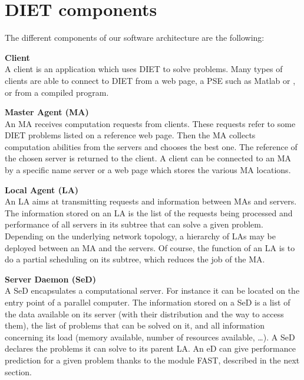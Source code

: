 \section{DIET components}
\label{sec:components}

The different components of our software architecture are the following:      

\begin{description}
\item \textbf{Client}\\
  A client is an application which uses DIET to solve problems.  Many types of clients are able to connect to DIET from a web page, a PSE such as
  Matlab or \sci, or from a compiled program.
\item \textbf{Master Agent (MA)}\\
  An MA receives computation requests from clients. These requests refer to some
  DIET problems listed on a reference web page. Then the MA collects computation
  abilities from the servers and chooses the best one. The reference of the
  chosen server is returned to the client. A client can be connected to an MA by
  a specific name server or a web page which stores the various MA locations.

\item \textbf{Local Agent (LA)}\\
  An LA aims at transmitting requests and information between MAs and
  servers.  The information stored on an LA is the list of the
  requests being processed and performance of all servers in its
  subtree that can solve a given problem. Depending on the underlying
  network topology, a hierarchy of LAs may be deployed between an MA
  and the servers. Of course, the function of an LA is to do a partial
  scheduling on its subtree, which reduces the job of the MA.

\item \textbf{Server Daemon (SeD)}\\
  A SeD encapsulates a computational server. For instance it can be
  located on the entry point of a parallel computer. The information
  stored on a SeD is a list of the data available on its server (with
  their distribution and the way to access them), the list of problems
  that can be solved on it, and all information concerning its load
  (memory available, number of resources available, \ldots). A SeD
  declares the problems it can solve to its parent LA.  An eD can give
  performance prediction for a given problem thanks to the module
  FAST, described in the next section.

\end{description}

